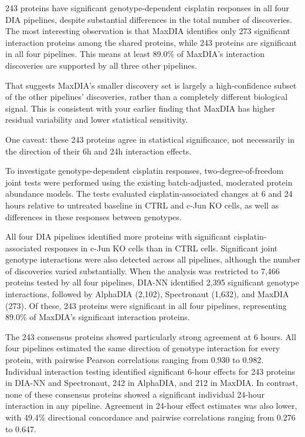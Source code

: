 \documentclass[
  10pt,
]{article}
\begin{document}
243 proteins have significant genotype-dependent cisplatin responses in
all four DIA pipelines, despite substantial differences in the total
number of discoveries. The most interesting observation is that MaxDIA
identifies only 273 significant interaction proteins among the shared
proteins, while 243 proteins are significant in all four pipelines. This
means at least 89.0\% of MaxDIA's interaction discoveries are supported
by all three other pipelines.

That suggests MaxDIA's smaller discovery set is largely a
high-confidence subset of the other pipelines' discoveries, rather than
a completely different biological signal. This is consistent with your
earlier finding that MaxDIA has higher residual variability and lower
statistical sensitivity.

One caveat: these 243 proteins agree in statistical significance, not
necessarily in the direction of their 6h and 24h interaction effects.

To investigate genotype-dependent cisplatin responses,
two-degree-of-freedom joint tests were performed using the existing
batch-adjusted, moderated protein abundance models. The tests evaluated
cisplatin-associated changes at 6 and 24 hours relative to untreated
baseline in CTRL and c-Jun KO cells, as well as differences in these
responses between genotypes.

All four DIA pipelines identified more proteins with significant
cisplatin-associated responses in c-Jun KO cells than in CTRL cells.
Significant joint genotype interactions were also detected across all
pipelines, although the number of discoveries varied substantially. When
the analysis was restricted to 7,466 proteins tested by all four
pipelines, DIA-NN identified 2,395 significant genotype interactions,
followed by AlphaDIA (2,102), Spectronaut (1,632), and MaxDIA (273). Of
these, 243 proteins were significant in all four pipelines, representing
89.0\% of MaxDIA's significant interaction proteins.

The 243 consensus proteins showed particularly strong agreement at 6
hours. All four pipelines estimated the same direction of genotype
interaction for every protein, with pairwise Pearson correlations
ranging from 0.930 to 0.982. Individual interaction testing identified
significant 6-hour effects for 243 proteins in DIA-NN and Spectronaut,
242 in AlphaDIA, and 212 in MaxDIA. In contrast, none of these consensus
proteins showed a significant individual 24-hour interaction in any
pipeline. Agreement in 24-hour effect estimates was also lower, with
49.4\% directional concordance and pairwise correlations ranging from
0.276 to 0.647.
\end{document}

